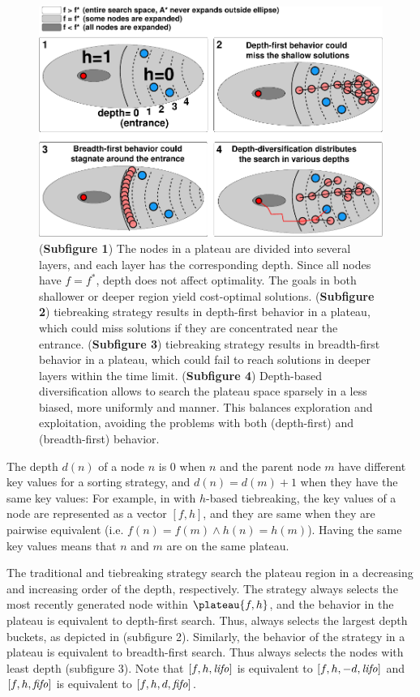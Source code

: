 \begin{figure}[htbp]
  \centering
  \includegraphics{img/astar/plateau-2.pdf}
 \caption{(\textbf{Subfigure 1}) The nodes in a plateau are divided into several layers, and each layer has the corresponding depth. Since all nodes have $f=f^*$, depth does not affect optimality. The goals in both shallower or deeper region yield cost-optimal solutions.
 (\textbf{Subfigure 2}) \lifo tiebreaking strategy results in depth-first behavior in a
 plateau, which could miss solutions if they are concentrated near the entrance.
 (\textbf{Subfigure 3}) \fifo tiebreaking strategy results in  breadth-first behavior in a
 plateau, which could fail to reach solutions in deeper layers within the time limit.
 (\textbf{Subfigure 4}) Depth-based diversification allows \astar to search the plateau space
 sparsely in a less biased, more uniformly and manner. This balances exploration and exploitation, avoiding the problems with both \lifo (depth-first) and \fifo (breadth-first) behavior.
 }
 \label{fig:plateau-depiction}
\end{figure}

The depth $d(n)$ of a
node $n$ is 0 when $n$ and the parent node $m$ have different key
values for a sorting strategy, and $d(n)=d(m)+1$ when they have the same
key values: For example, in \astar with $h$-based tiebreaking, the key
values of a node are represented as a vector $[f,h]$, and they are same
when they are pairwise equivalent (i.e. $f(n) = f(m) \land h(n) =
h(m)$).  Having the same key values means that $n$ and $m$ are on the
same plateau.

The traditional \lifo and \fifo tiebreaking strategy 
search the plateau region in a decreasing and increasing order of the depth, respectively.
The \lifo strategy always selects the most recently generated node
within $\plateau{f,h}$, and the behavior in the plateau is equivalent to depth-first search.
Thus, \lifo always selects the largest depth
buckets, as depicted in  (subfigure 2).
Similarly, the behavior of the \fifo strategy 
in a plateau is equivalent to breadth-first search. Thus \fifo 
always selects the nodes with least depth (subfigure 3).
Note that  $[f,h,{\text{\textit{lifo}}}]$ is equivalent to $[f,h,-d,{\text{\textit{lifo}}}]$ and
$[f,h,{\text{\textit{fifo}}}]$ is equivalent to $[f,h,d,{\text{\textit{fifo}}}]$.

